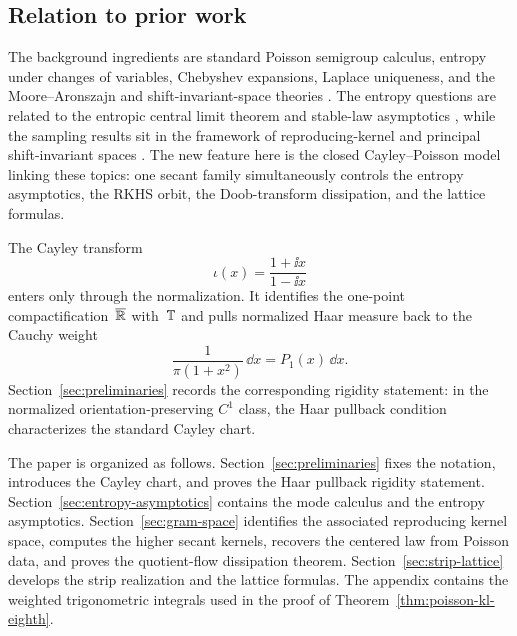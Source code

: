 \subsection{Relation to prior work}

The background ingredients are standard Poisson semigroup calculus,
entropy under changes of variables, Chebyshev expansions, Laplace
uniqueness, and the Moore--Aronszajn and shift-invariant-space theories
\cite{CoverThomas2006,Stein1971,Folland1995,Kwasnicki2017,MasonHandscomb2002,Widder1941,Lukacs1970,Feller1971,Aronszajn1950,deBoorDeVoreRon1994,RonShen1995,AldroubiGrochenig2001}.
The entropy questions are related to the entropic central limit theorem
and stable-law asymptotics
\cite{Barron1986,JohnsonBarron2004,ArtsteinBallBartheNaor2004,CarlenCarvalho1992,BobkovChistyakovGotzeEdgeworth2013,BobkovChistyakovGotzeBerryEsseen2014,BobkovChistyakovGotze2013,ToscaniFractionalFisher2016,Toscani2016},
while the sampling results sit in the framework of reproducing-kernel
and principal shift-invariant spaces
\cite{GrochenigRomeroStockler2018,GrochenigRomeroStockler2020,FuhrGrochenigHaimiKlotzRomero2017,KiselevMininNovikovSitnik2014,KiselevMininNovikov2016,KiselevMininNovikov2019,UlanovskiiZlotnikov2025}.
The new feature here is the closed Cayley--Poisson model linking these
topics: one secant family simultaneously controls the entropy
asymptotics, the RKHS orbit, the Doob-transform dissipation, and the
lattice formulas.

The Cayley transform
\[
\iota(x)=\frac{1+\ii x}{1-\ii x}
\]
enters only through the normalization.  It identifies the one-point
compactification~$\overline{\mathbb{R}}$ with~$\mathbb{T}$ and pulls normalized Haar
measure back to the Cauchy weight
\[
\frac{1}{\pi(1+x^2)}\,\dd x=P_1(x)\,\dd x.
\]
Section~\ref{sec:preliminaries} records the corresponding rigidity
statement: in the normalized orientation-preserving $C^1$ class, the
Haar pullback condition characterizes the standard Cayley chart.

The paper is organized as follows.  Section~\ref{sec:preliminaries}
fixes the notation, introduces the Cayley chart, and proves the Haar
pullback rigidity statement.  Section~\ref{sec:entropy-asymptotics}
contains the mode calculus and the entropy asymptotics.
Section~\ref{sec:gram-space} identifies the associated reproducing
kernel space, computes the higher secant kernels, recovers the
centered law from Poisson data, and proves the quotient-flow
dissipation theorem.  Section~\ref{sec:strip-lattice}
develops the strip realization and the lattice formulas.  The appendix
contains the weighted trigonometric integrals used in the proof of
Theorem~\ref{thm:poisson-kl-eighth}.
